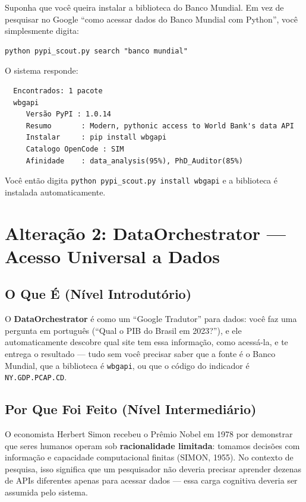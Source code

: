 \documentclass[12pt,a4paper]{article}
\begin{document}
Suponha que você queira instalar a biblioteca do Banco Mundial. Em vez de pesquisar no Google ``como acessar dados do Banco Mundial com Python'', você simplesmente digita:

\begin{verbatim}
python pypi_scout.py search "banco mundial"
\end{verbatim}

O sistema responde:

\begin{verbatim}
  Encontrados: 1 pacote
  wbgapi
     Versão PyPI : 1.0.14
     Resumo       : Modern, pythonic access to World Bank's data API
     Instalar     : pip install wbgapi
     Catalogo OpenCode : SIM
     Afinidade    : data_analysis(95%), PhD_Auditor(85%)
\end{verbatim}

Você então digita \texttt{python pypi\_scout.py install wbgapi} e a biblioteca é instalada automaticamente.

\section{Alteração 2: DataOrchestrator --- Acesso Universal a Dados}

\subsection{O Que É (Nível Introdutório)}

O \textbf{DataOrchestrator} é como um ``Google Tradutor'' para dados: você faz uma pergunta em português (``Qual o PIB do Brasil em 2023?''), e ele automaticamente descobre qual site tem essa informação, como acessá-la, e te entrega o resultado --- tudo sem você precisar saber que a fonte é o Banco Mundial, que a biblioteca é \texttt{wbgapi}, ou que o código do indicador é \texttt{NY.GDP.PCAP.CD}.

\subsection{Por Que Foi Feito (Nível Intermediário)}

O economista Herbert Simon recebeu o Prêmio Nobel em 1978 por demonstrar que seres humanos operam sob \textbf{racionalidade limitada}: tomamos decisões com informação e capacidade computacional finitas (SIMON, 1955). No contexto de pesquisa, isso significa que um pesquisador não deveria precisar aprender dezenas de APIs diferentes apenas para acessar dados --- essa carga cognitiva deveria ser assumida pelo sistema.
\end{document}
